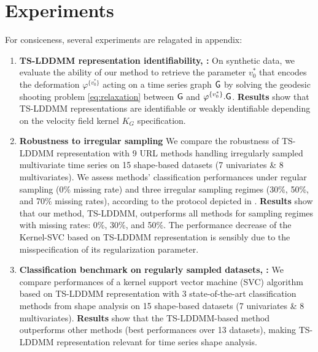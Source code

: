\section{Experiments}
\label{section:experiments}

For consiceness, several experiments are relagated in appendix: 

\begin{enumerate}
    \item \textbf{TS-LDDMM representation identifiability, :} On synthetic data, we evaluate the ability of our method to retrieve the parameter $v_0^*$ that encodes the deformation $\varphi^{\{v_0^*\}}$ acting on a time series graph $\mathsf{G}$ by solving the geodesic shooting problem \eqref{eq:relaxation} between $\mathsf{G}$ and $\varphi^{\{v_0^*\}}.\mathsf{G}$. \textbf{Results} show that TS-LDDMM representations are identifiable or weakly identifiable depending on the velocity field kernel $K_G$ specification.
  
    \item \textbf{Robustness to irregular sampling} We compare the robustness of TS-LDDMM representation with 9 URL methods handling irregularly sampled multivariate time series on 15 shape-based datasets (7 univariates \& 8 multivariates). We assess methods' classification performances under regular sampling (0\% missing rate) and three irregular sampling regimes (30\%, 50\%, and 70\% missing rates), according to the protocol depicted in \cite{kidger2020neural}. \textbf{Results} show that our method, TS-LDDMM, outperforms all methods for sampling regimes with missing rates: 0\%, 30\%, and 50\%. The performance decrease of the Kernel-SVC based on TS-LDDMM representation is sensibly due to the misspecification of its regularization parameter.
    
    \item \textbf{Classification benchmark on regularly sampled datasets, :} We compare performances of a kernel support vector machine (SVC) algorithm based on TS-LDDMM representation with 3 state-of-the-art classification methods from shape analysis on 15 shape-based datasets (7 univariates \& 8 multivariates). \textbf{Results} show that the TS-LDDMM-based method outperforms other methods (best performances over 13 datasets), making TS-LDDMM representation relevant for time series shape analysis.
\end{enumerate}



